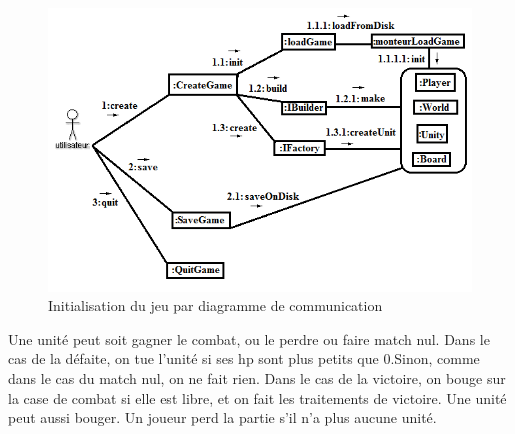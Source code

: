 \begin{figure}[!h]
\centering
\includegraphics[width=1\textwidth]{img/com.png}
\caption{Initialisation du jeu par diagramme de communication}
\end{figure}

Une unité peut soit gagner le combat, ou le perdre ou faire match nul. Dans le cas de la défaite, on tue l'unité si ses hp sont plus petits que 0.Sinon, comme dans le cas du match nul, on ne fait rien. Dans le cas de la victoire, on bouge sur la case de combat si elle est libre, et on fait les traitements de victoire. Une unité peut aussi bouger. Un joueur perd la partie s'il n'a plus aucune unité.